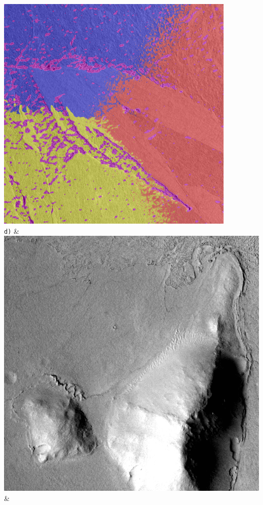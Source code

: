 \begin{table}[h!]
\begin{tabularx}{\textwidth}
		\includegraphics[width=0.9\linewidth]{images/gen/spatial_weight/p03_03.png_1.66.png} \\
		\texttt{d)} &
		\includegraphics[width=0.9\linewidth]{images/p03/p03_04.png} &

\end{tabularx}
\end{table}
